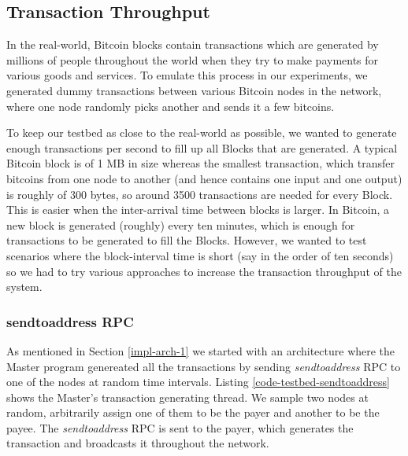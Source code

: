 \subsection{Transaction Throughput} \label{impl-transactions}

In the real-world, Bitcoin blocks contain transactions which are generated by millions of people throughout the world when they try to make payments for various goods and services. To emulate this process in our experiments, we generated dummy transactions between various Bitcoin nodes in the network, where one node randomly picks another and sends it a few bitcoins.


To keep our testbed as close to the real-world as possible, we wanted to generate enough transactions per second to fill up all Blocks that are generated. A typical Bitcoin block is of 1 MB in size whereas the smallest transaction, which transfer bitcoins from one node to another (and hence contains one input and one output) is roughly of 300 bytes, so around 3500 transactions are needed for every Block. This is easier when the inter-arrival time between blocks is larger. In Bitcoin, a new block is generated (roughly) every ten minutes, which is enough for transactions to be generated to fill the Blocks. However, we wanted to test scenarios where the block-interval time is short (say in the order of ten seconds) so we had to try various approaches to increase the transaction throughput of the system.

\subsubsection{sendtoaddress RPC}

As mentioned in Section \ref{impl-arch-1} we started with an architecture where the Master program genereated all the transactions by sending \textit{sendtoaddress} RPC to one of the nodes at random time intervals. Listing \ref{code-testbed-sendtoaddress} shows the Master's transaction generating thread. 
We sample two nodes at random, arbitrarily assign one of them to be the payer and another to be the payee.
The \textit{sendtoaddress} RPC is sent to the payer, which generates the transaction and broadcasts it throughout the network.

